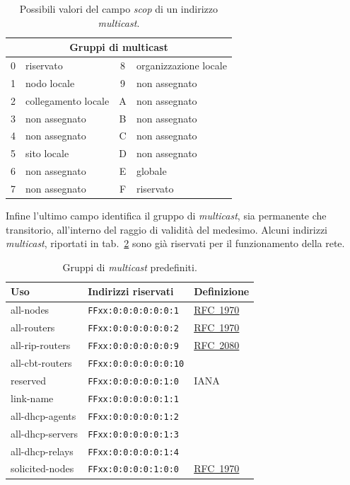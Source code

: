 \begin{table}[!htb]
  \centering 
  \footnotesize
  \begin{tabular}[c]{|c|l|c|l|}
    \hline
    \multicolumn{4}{|c|}{\bf Gruppi di multicast} \\
    \hline
    \hline
    0 & riservato & 8 & organizzazione locale \\
    1 & nodo locale & 9 & non assegnato \\
    2 & collegamento locale & A & non assegnato \\
    3 & non assegnato & B & non assegnato \\
    4 & non assegnato & C & non assegnato \\ 
    5 & sito locale & D & non assegnato \\
    6 & non assegnato & E & globale \\
    7 & non assegnato & F & riservato \\
    \hline
  \end{tabular}
\caption{Possibili valori del campo \textsl{scop} di un indirizzo
  \textit{multicast}.} 
\label{tab:IP_ipv6_multiscope}
\end{table}

Infine l'ultimo campo identifica il gruppo di \textit{multicast}, sia
permanente che transitorio, all'interno del raggio di validità del medesimo.
Alcuni indirizzi \textit{multicast}, riportati in tab.~\ref{tab:multiadd} sono
già riservati per il funzionamento della rete.

\begin{table}[!htb]
  \centering 
  \footnotesize
  \begin{tabular}[c]{|l|l|l|}
    \hline
    \textbf{Uso}& \textbf{Indirizzi riservati} & \textbf{Definizione}\\
    \hline 
    \hline 
    all-nodes       & \texttt{FFxx:0:0:0:0:0:0:1}  & 
                      \href{http://www.ietf.org/rfc/rfc1970.txt}{RFC~1970} \\
    all-routers     & \texttt{FFxx:0:0:0:0:0:0:2}  & 
                      \href{http://www.ietf.org/rfc/rfc1970.txt}{RFC~1970} \\
    all-rip-routers & \texttt{FFxx:0:0:0:0:0:0:9}  & 
                      \href{http://www.ietf.org/rfc/rfc2080.txt}{RFC~2080} \\
    all-cbt-routers & \texttt{FFxx:0:0:0:0:0:0:10} & \\
    reserved        & \texttt{FFxx:0:0:0:0:0:1:0}  & IANA \\
    link-name       & \texttt{FFxx:0:0:0:0:0:1:1}  &  \\
    all-dhcp-agents & \texttt{FFxx:0:0:0:0:0:1:2}  & \\
    all-dhcp-servers& \texttt{FFxx:0:0:0:0:0:1:3}  & \\
    all-dhcp-relays & \texttt{FFxx:0:0:0:0:0:1:4}  & \\
    solicited-nodes & \texttt{FFxx:0:0:0:0:1:0:0}  & 
                      \href{http://www.ietf.org/rfc/rfc1970.txt}{RFC~1970} \\
    \hline
  \end{tabular}
\caption{Gruppi di \textit{multicast} predefiniti.}
\label{tab:multiadd}
\end{table}


